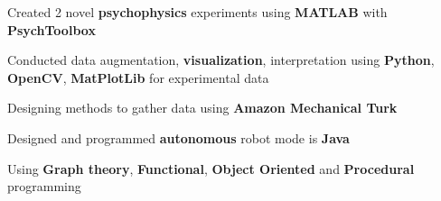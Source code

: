 \documentclass[]{chandan-cv}
\begin{document}
\begin{minipage}[t]{0.71\textwidth}
\begin{tightemize}
	\item Created 2 novel \textbf{psychophysics} experiments using \textbf{MATLAB} with \textbf{PsychToolbox}
	\item Conducted data augmentation, \textbf{visualization}, interpretation using \textbf{Python}, \textbf{OpenCV}, \textbf{MatPlotLib} for experimental data
	\item Designing methods to gather data using \textbf{Amazon Mechanical Turk}
\end{tightemize}
\sectionsep

\begin{tightemize}
	\item Designed and programmed \textbf{autonomous} robot mode is \textbf{Java}
	\item Using \textbf{Graph theory}, \textbf{Functional}, \textbf{Object Oriented} and \textbf{Procedural} programming
\end{tightemize}
\sectionsep



\end{minipage}
\end{document}
